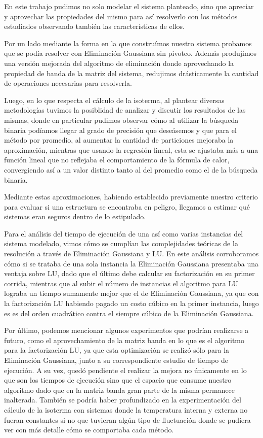 \setlength{\parindent}{15.0pt} %
En este trabajo pudimos no solo modelar el sistema planteado, sino que
apreciar y aprovechar las propiedades del mismo para así resolverlo con los
métodos estudiados observando también las características de ellos.

Por un lado mediante la forma en la que construímos nuestro sistema probamos
que se podía resolver con Eliminación Gaussiana sin pivoteo. Además produjimos
una versión mejorada del algoritmo de eliminación donde aprovechando la
propiedad de banda de la matriz del sistema, redujimos drásticamente la
cantidad de operaciones necesarias para resolverla.

Luego, en lo que respecta el cálculo de la isoterma, al plantear diversas
metodologías tuvimos la posiblidad de analizar y discutir los resultados de las
mismas, donde en particular pudimos observar cómo al utilizar la búsqueda
binaria podíamos llegar al grado de precisión que deseásemos y que para el
método por promedio, al aumentar la cantidad de particiones mejoraba la
aproximación, mientras que usando la regresión lineal, esta se ajustaba más a
una función lineal que no reflejaba el comportamiento de la fórmula de calor,
convergiendo así a un valor distinto tanto al del promedio como el de la
búsqueda binaria.

Mediante estas aproximaciones, habiendo establecido previamente nuestro
criterio para evaluar si una estructura se encontraba en peligro, llegamos a
estimar qué sistemas eran seguros dentro de lo estipulado.

Para el análisis del tiempo de ejecución de una así como
varias instancias del sistema modelado, vimos cómo se cumplían las complejidades
teóricas de la resolución a través de Eliminación Gaussiana y LU. En este
análisis corroboramos cómo si se trataba de una sola instancia la Eliminación
Gaussiana presentaba una ventaja sobre LU, dado que el último debe calcular su
factorización en su primer corrida, mientras que al subir el número de
instancias el algoritmo para LU lograba un tiempo sumamente mejor que el de
Eliminación Gaussiana, ya que con la factorización LU habiendo pagado un costo
cúbico en la primer instancia, luego es es del orden cuadrático contra el
siempre cúbico de la Eliminación Gaussiana.

Por último, podemos mencionar algunos experimentos que podrían realizarse a
futuro, como el aprovechamiento de la matriz banda en lo que es el algoritmo
para la factorización LU, ya que esta optimización se realizó sólo para la
Eliminación Gaussiana, junto a su correspondiente estudio de tiempo de
ejecución. A su vez, quedó pendiente el realizar la mejora no únicamente en lo
que son los tiempos de ejecución sino que el espacio que consume nuestro
algoritmo dado que en la matriz banda gran parte de la misma permanece
inalterada. También se podría haber profundizado en la experimentación del
cálculo de la isoterma con sistemas donde la temperatura interna y externa no
fueran constantes si no que tuvieran algún tipo de fluctuación donde se pudiera
ver con más detalle cómo se comportaba cada método.
